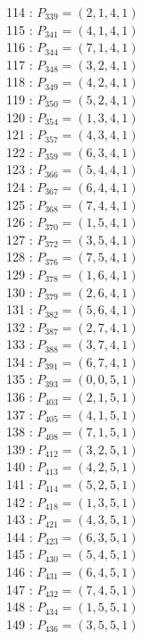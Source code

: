 \documentclass{article}
\begin{document}
{\begin{multicols}{3}
114 : $P_{339}=( 2, 1, 4, 1 )$\\
115 : $P_{341}=( 4, 1, 4, 1 )$\\
116 : $P_{344}=( 7, 1, 4, 1 )$\\
117 : $P_{348}=( 3, 2, 4, 1 )$\\
118 : $P_{349}=( 4, 2, 4, 1 )$\\
119 : $P_{350}=( 5, 2, 4, 1 )$\\
120 : $P_{354}=( 1, 3, 4, 1 )$\\
121 : $P_{357}=( 4, 3, 4, 1 )$\\
122 : $P_{359}=( 6, 3, 4, 1 )$\\
123 : $P_{366}=( 5, 4, 4, 1 )$\\
124 : $P_{367}=( 6, 4, 4, 1 )$\\
125 : $P_{368}=( 7, 4, 4, 1 )$\\
126 : $P_{370}=( 1, 5, 4, 1 )$\\
127 : $P_{372}=( 3, 5, 4, 1 )$\\
128 : $P_{376}=( 7, 5, 4, 1 )$\\
129 : $P_{378}=( 1, 6, 4, 1 )$\\
130 : $P_{379}=( 2, 6, 4, 1 )$\\
131 : $P_{382}=( 5, 6, 4, 1 )$\\
132 : $P_{387}=( 2, 7, 4, 1 )$\\
133 : $P_{388}=( 3, 7, 4, 1 )$\\
134 : $P_{391}=( 6, 7, 4, 1 )$\\
135 : $P_{393}=( 0, 0, 5, 1 )$\\
136 : $P_{403}=( 2, 1, 5, 1 )$\\
137 : $P_{405}=( 4, 1, 5, 1 )$\\
138 : $P_{408}=( 7, 1, 5, 1 )$\\
139 : $P_{412}=( 3, 2, 5, 1 )$\\
140 : $P_{413}=( 4, 2, 5, 1 )$\\
141 : $P_{414}=( 5, 2, 5, 1 )$\\
142 : $P_{418}=( 1, 3, 5, 1 )$\\
143 : $P_{421}=( 4, 3, 5, 1 )$\\
144 : $P_{423}=( 6, 3, 5, 1 )$\\
145 : $P_{430}=( 5, 4, 5, 1 )$\\
146 : $P_{431}=( 6, 4, 5, 1 )$\\
147 : $P_{432}=( 7, 4, 5, 1 )$\\
148 : $P_{434}=( 1, 5, 5, 1 )$\\
149 : $P_{436}=( 3, 5, 5, 1 )$\\

\end{multicols}}
\end{document}
